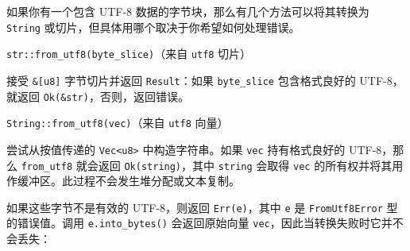 如果你有一个包含 UTF-8 数据的字节块，那么有几个方法可以将其转换为 \texttt{String} 或切片，但具体用哪个取决于你希望如何处理错误。

\begin{myNote}
\texttt{str::from\_utf8(byte\_slice)}（来自 \texttt{utf8} 切片）
\end{myNote}

接受 \texttt{\&[u8]} 字节切片并返回 \texttt{Result}：如果 \texttt{byte\_slice} 包含格式良好的 UTF-8，就返回 \texttt{Ok(\&str)}，否则，返回错误。

\begin{myNote}
\texttt{String::from\_utf8(vec)}（来自 \texttt{utf8} 向量）
\end{myNote}

尝试从按值传递的 \texttt{Vec<u8>} 中构造字符串。如果 \texttt{vec} 持有格式良好的 UTF-8，那么 \texttt{from\_utf8} 就会返回 \texttt{Ok(string)}，其中 \texttt{string} 会取得 \texttt{vec} 的所有权并将其用作缓冲区。此过程不会发生堆分配或文本复制。

如果这些字节不是有效的 UTF-8，则返回 \texttt{Err(e)}，其中 \texttt{e} 是 \texttt{FromUtf8Error} 型的错误值。调用 \texttt{e.into\_bytes()} 会返回原始向量 \texttt{vec}，因此当转换失败时它并不会丢失：

